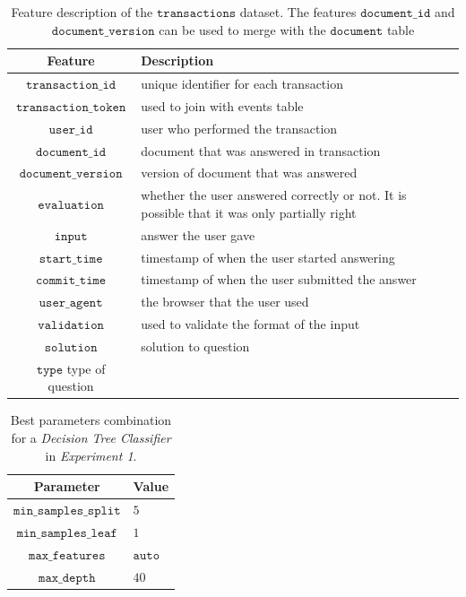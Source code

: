 \documentclass[sigplan,screen]{acmart}
\begin{document}
\begin{table}[h]
  \caption{Feature description of the $\texttt{transactions}$ dataset. The features $\texttt{document\_id}$ and $\texttt{document\_version}$ can be used to merge with the $\texttt{document}$ table}
  \label{tab:transactions}
  \begin{tabular}{cl}
    \toprule
    \textbf{Feature}&\textbf{Description}\\
    \midrule
    $\texttt{transaction\_id}$ & unique identifier for each transaction \\
    $\texttt{transaction\_token}$ & used to join with events table \\
    $\texttt{user\_id}$ & user who performed the transaction \\
    $\texttt{document\_id}$ & document that was answered in transaction \\
    $\texttt{document\_version}$ & version of document that was answered \\
    $\texttt{evaluation}$ & whether the user answered correctly or not. It is possible that it was only partially right \\
    $\texttt{input}$ & answer the user gave \\
    $\texttt{start\_time}$ & timestamp of when the user started answering \\
    $\texttt{commit\_time}$ & timestamp of when the user submitted the answer \\
    $\texttt{user\_agent}$ & the browser that the user used \\
    $\texttt{validation}$ & used to validate the format of the input \\
    $\texttt{solution}$ & solution to question \\
    $\texttt{type}$ type of question \\
    \bottomrule
    \end{tabular}
\end{table}

\begin{table}[h]
  \caption{Best parameters combination for a \emph{Decision Tree Classifier} in \emph{Experiment 1}.}
  \label{tab:dc_1}
  \begin{tabular}{cl}
    \toprule
    \textbf{Parameter}&\textbf{Value}\\
    \midrule
    $\texttt{min\_samples\_split}$ & $5$ \\
    $\texttt{min\_samples\_leaf}$ & $1$ \\
    $\texttt{max\_features}$ & $\texttt{auto}$ \\
    $\texttt{max\_depth}$ & $40$ \\
    \bottomrule
    \end{tabular}
\end{table}
\end{document}

